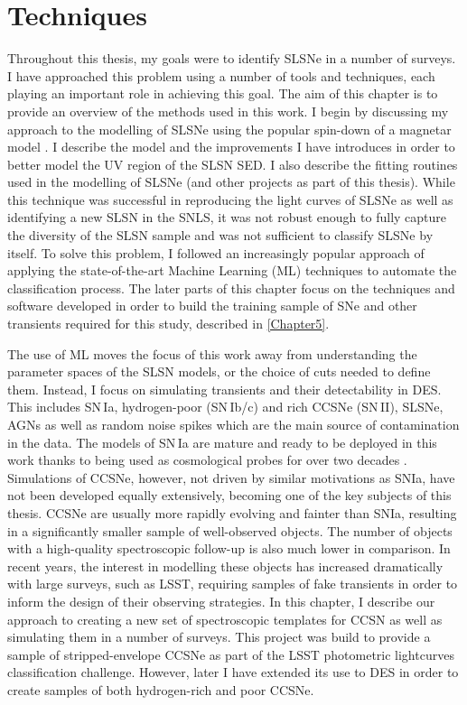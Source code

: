 \chapter{Techniques}
\label{Chapter4}

Throughout this thesis, my goals were to identify SLSNe in a number of surveys. I have approached this problem using a number of tools and techniques, each playing an important role in achieving this goal. The aim of this chapter is to provide an overview of the methods used in this work. I begin by discussing my approach to the modelling of SLSNe using the popular spin-down of a magnetar model . I describe the model and the improvements I have introduces in order to better model the UV region of the SLSN SED. I also describe the fitting routines used in the modelling of SLSNe (and other projects as part of this thesis). While this technique was successful in reproducing the light curves of SLSNe as well as identifying a new SLSN in the SNLS, it was not robust enough to fully capture the diversity of the SLSN sample and was not sufficient to classify SLSNe by itself. To solve this problem, I followed an increasingly popular approach of applying the state-of-the-art Machine Learning (ML) techniques to automate the classification process. The later parts of this chapter focus on the techniques and software developed in order to build the training sample of SNe and other transients required for this study, described in \cref{Chapter5}.

The use of ML moves the focus of this work away from understanding the parameter spaces of the SLSN models, or the choice of cuts needed to define them. Instead, I focus on simulating transients and their detectability in DES. This includes SN\,Ia, hydrogen-poor (SN\,Ib/c) and rich CCSNe (SN\,II), SLSNe, AGNs as well as random noise spikes which are the main source of contamination in the data. The models of SN\,Ia are mature and ready to be deployed in this work \citep{Kessler2009,Kessler2015} thanks to being used as cosmological probes for over two decades \citep{Riess1998,Perlmutter1999}. Simulations of CCSNe, however, not driven by similar motivations as SNIa, have not been developed equally extensively, becoming one of the key subjects of this thesis. CCSNe are usually more rapidly evolving and fainter than SNIa, resulting in a significantly smaller sample of well-observed objects. The number of objects with a high-quality spectroscopic follow-up is also much lower in comparison. In recent years, the interest in modelling these objects has increased dramatically with large surveys, such as LSST, requiring samples of fake transients in order to inform the design of their observing strategies. In this chapter, I describe our approach to creating a new set of spectroscopic templates for CCSN as well as simulating them in a number of surveys. This project was build to provide a sample of stripped-envelope CCSNe as part of the LSST photometric lightcurves classification challenge. However, later I have extended its use to DES in order to create samples of both hydrogen-rich and poor CCSNe.

